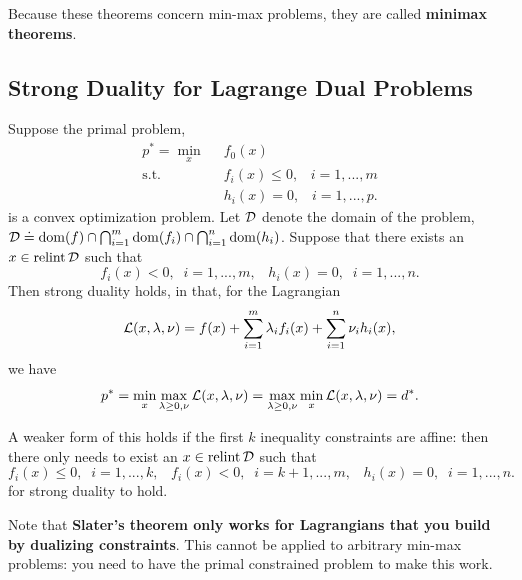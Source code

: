 \documentclass[12pt]{article}
\begin{document}
Because these theorems concern min-max problems, they are called \textbf{minimax theorems}.  

\subsection{Strong Duality for Lagrange Dual Problems}

\begin{theorem} 
Suppose the primal problem, 
%
\begin{equation*}
\begin{aligned}
p^* = \min_{x} \;\;& f_0(x) \\
\text{s.t. } \;\;&  f_i (x) \leq 0, \;\;\; i = 1, ..., m \\
& h_i (x) = 0, \;\;\; i= 1, ..., p.
\end{aligned}
\end{equation*} 
%
is a convex optimization problem. Let ${\mathcal D}$ denote the domain of the problem, ${\mathcal D} \doteq \mathop {\mathrm {dom}}(f) \cap \bigcap_{i=1}^m \mathop {\mathrm {dom}}(f_i)  \cap \bigcap_{i=1}^n \mathop {\mathrm {dom}}(h_i)$. Suppose that there exists an $x \in {\mbox{\rm relint}\,}{{\mathcal D}}$ such that
%
\begin{equation*}
f_i(x) < 0, \;\; i=1,...,m, \;\;\; h_i (x) = 0, \;\; i=1,...,n.
\end{equation*}
%
Then strong duality holds, in that, for the Lagrangian
%
\begin{equation*}
{\mathcal L}(x,\lambda, \nu) = f(x) + \sum_{i=1}^m \lambda_i f_i (x) + \sum_{i=1}^n \nu_i h_i (x),
\end{equation*}
%
we have
%
\begin{equation*}
p^* = \min_x \max_{\lambda \geq 0, \nu} {\mathcal L}(x,\lambda, \nu) = \max_{\lambda \geq 0, \nu} \min_x  {\mathcal L}(x,\lambda, \nu)  = d^*.
\end{equation*}

A weaker form of this holds if the first $k$ inequality constraints are affine: then there only needs to exist an $x \in {\mbox{\rm relint}\,}{{\mathcal D}}$ such that
%
\begin{equation*}
f_i(x) \leq 0, \;\; i=1,...,k, \;\;\; f_i(x) < 0, \;\; i=k+1,...,m, \;\;\; h_i (x) = 0, \;\; i=1,...,n.
\end{equation*}
%
for strong duality to hold.
\end{theorem}

Note that \textbf{Slater's theorem only works for Lagrangians that you build by dualizing constraints}. This cannot be applied to arbitrary min-max problems: you need to have the primal constrained problem to make this work. 
\end{document}
